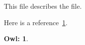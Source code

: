 \documentclass{article}
\theoremstyle{break}
\newtheorem{omn}{Owl:}
\begin{document}
\omnsummary



This file describes the \omndocfile{} file. 




Here is a reference~\ref{omn:role}.

\begin{omn}
  \label{omn:role}
\end{omn}

\end{document}
